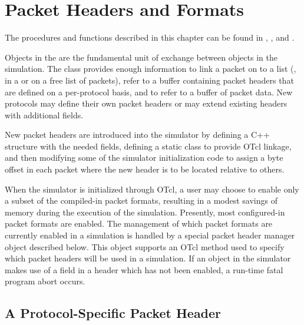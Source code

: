 %
%
\chapter{Packet Headers and Formats}
\label{chap:pformat}

The procedures and functions described in this chapter can be found in
,
, and .

Objects in the  are the fundamental unit of
exchange between objects in the simulation.
The class 
provides enough information to link a packet on to a list
(\ie, in a  or on a free list of packets),
refer to a buffer containing packet headers
that are defined on a per-protocol basis,
and to refer to a buffer of packet data.
New protocols may define their own packet headers or may extend
existing headers with additional fields.

New packet headers are introduced into the simulator
by defining a C++ structure with the needed fields,
defining a static class to provide OTcl linkage,
and then modifying some of the simulator initialization code
to assign a byte offset in each packet where the new header
is to be located relative to others.

When the simulator is initialized through OTcl,
a user may choose to enable
only a subset of the compiled-in packet formats, resulting in
a modest savings of memory during the execution of the simulation.
Presently, most configured-in packet formats are enabled.
The management of which packet formats are currently enabled
in a simulation is handled by a special packet header manager
object described below.
This object supports an OTcl method used to specify
which packet headers will be used in a simulation.
If an object in the simulator makes use of a field in a header
which has not been enabled, a run-time fatal program abort occurs.

\section{A Protocol-Specific Packet Header}
\label{sec:ppackethdr}


